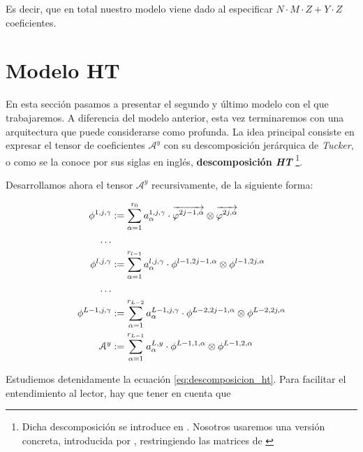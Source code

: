 Es decir, que en total nuestro modelo viene dado al especificar $N \cdot M \cdot Z + Y \cdot Z$ coeficientes.

\section{Modelo HT} \label{sec:modelo_ht}

En esta sección pasamos a presentar el segundo y último modelo con el que trabajaremos. A diferencia del modelo anterior, esta vez terminaremos con una arquitectura que puede considerarse como profunda. La idea principal consiste en expresar el tensor de coeficientes $\mathcal{A}^y$ con su descomposición jerárquica de \textit{Tucker}, o como se la conoce por sus siglas en inglés, \textbf{descomposición \textit{HT}} \footnote{Dicha descomposición se introduce en \cite{matematicas:descomposicion_ht}. Nosotros usaremos una versión concreta, introducida por \cite{matematicas:principal}, restringiendo las matrices de \cite{matematicas:descomposicion_ht}}.

Desarrollamos ahora el tensor $\mathcal{A}^y$ recursivamente, de la siguiente forma:

\begin{equation} \label{eq:descomposicion_ht}
\begin{split}
    \phi^{1, j, \gamma} &:= \sum_{\alpha = 1}^{r_0} a_{\alpha}^{1, j, \gamma} \cdot \overrightarrow{\varphi^{2j-1, \alpha}} \otimes \overrightarrow{\varphi^{2j, \alpha}} \\
    \ldots \\
    \phi^{l, j, \gamma} &:= \sum_{\alpha = 1}^{r_{l-1}} a_{\alpha}^{l, j, \gamma} \cdot \phi^{l-1, 2j-1, \alpha} \otimes \phi^{l-1, 2j, \alpha} \\
    \ldots \\
    \phi^{L - 1, j, \gamma} &:= \sum_{\alpha = 1}^{r_{L-2}} a_{\alpha}^{L - 1, j, \gamma} \cdot \phi^{L-2, 2j-1, \alpha} \otimes \phi^{L-2, 2j, \alpha} \\
    \mathcal{A}^y &:= \sum_{\alpha = 1}^{r_{L-1}} a_{\alpha}^{L, y} \cdot \phi^{L-1, 1, \alpha} \otimes \phi^{L-1, 2, \alpha}
\end{split}
\end{equation}

Estudiemos detenidamente la ecuación \eqref{eq:descomposicion_ht}. Para facilitar el entendimiento al lector, hay que tener en cuenta que


